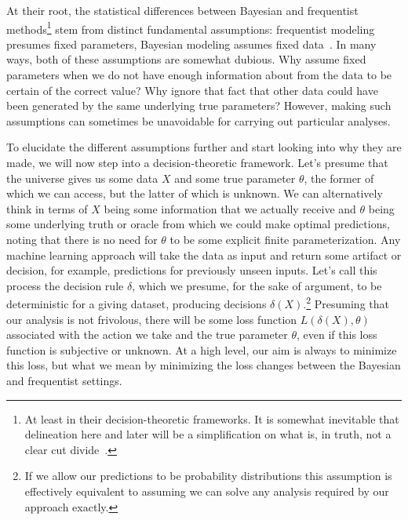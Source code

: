 At their root, the statistical differences between Bayesian and frequentist methods\footnote{At least in their decision-theoretic
frameworks.  It is somewhat inevitable that delineation here and later will be a simplification on what is, in truth, not a clear
cut divide~\citep{gelman2011induction}.}
stem from distinct fundamental
assumptions: frequentist modeling presumes fixed parameters, Bayesian modeling assumes fixed data~\citep{jordan2009you}.  In many ways,
both of these assumptions are somewhat dubious. Why assume fixed parameters when we do not have enough
information about from the data to be certain of the correct value?  Why ignore that fact that other data could have 
been generated by the same underlying true parameters?  However,
making such assumptions can sometimes be unavoidable for carrying out particular analyses.

To elucidate the
different assumptions further and start looking into why they are made, we will now step into a decision-theoretic
framework.  Let's presume that the universe gives us some data $X$ and some true parameter $\theta$, the former of which
we can access, but the latter of which is unknown.  We can alternatively think in terms of $X$ being some information
that we actually receive and $\theta$ being some underlying truth or oracle from which we could make optimal predictions, noting 
that there is
no need for $\theta$ to be some explicit finite parameterization.  Any machine learning approach will take the data as input and
return some artifact or decision, for example, predictions for previously unseen inputs.  
Let's call this process the decision rule $\delta$, which we presume, for the sake of argument, to be 
deterministic for a giving dataset, producing decisions $\delta(X)$.\footnote{If we allow our predictions to be probability
distributions this assumption is effectively equivalent to assuming we can solve any analysis required by our approach exactly.}
Presuming that our analysis is not frivolous, there will be some loss function $L(\delta(X),\theta)$ associated with the action we take
and the true parameter $\theta$, even if this loss function is subjective or unknown.  At a high level, our aim is always to
minimize this loss, but what we mean by minimizing the loss changes between the Bayesian and frequentist settings.  

